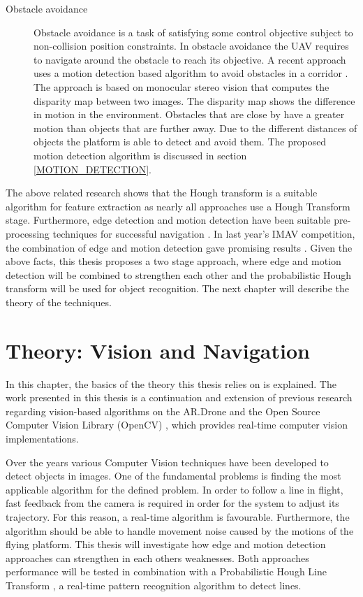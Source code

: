 \documentclass[a4paper]{article}
\begin{document}
\begin{description}
\item[Obstacle avoidance] Obstacle avoidance is a task of satisfying some control objective subject to non-collision position constraints. In obstacle avoidance the UAV requires to navigate around the obstacle to reach its objective. A recent approach uses a motion detection based algorithm to avoid obstacles in a corridor \cite{Jurriaans2011}. The approach is based on monocular stereo vision that computes the disparity map between two images. The disparity map shows the difference in motion in the environment. Obstacles that are close by have a greater motion than objects that are further away. Due to the different distances of objects the platform is able to detect and avoid them. The proposed motion detection algorithm is discussed in section \ref{MOTION_DETECTION}.
\end{description}

The above related research shows that the Hough transform is a suitable algorithm for feature extraction as nearly all approaches use a Hough Transform stage. Furthermore, edge detection and motion detection have been suitable pre-processing techniques for successful navigation \cite{Bills2011, Jurriaans2011}. In last year's IMAV competition, the combination of edge and motion detection gave promising results \cite{Gerke2011}. Given the above facts, this thesis proposes a two stage approach, where edge and motion detection will be combined to strengthen each other and the probabilistic Hough transform will be used for object recognition. The next chapter will describe the theory of the techniques.

\newpage
\section{Theory: Vision and Navigation}
\label{THEORY}
In this chapter, the basics of the theory this thesis relies on is explained. The work presented in this thesis is a continuation and extension of previous research regarding vision-based algorithms on the AR.Drone \cite{Jurriaans2011} and the Open Source Computer Vision Library (OpenCV) \cite{Bradski2008}, which provides real-time computer vision implementations.

Over the years various Computer Vision techniques have been developed to detect objects in images. One of the fundamental problems is finding the most applicable algorithm for the defined problem. In order to follow a line in flight, fast feedback from the camera is required in order for the system to adjust its trajectory. For this reason, a real-time algorithm is favourable. Furthermore, the algorithm should be able to handle movement noise caused by the motions of the flying platform. This thesis will investigate how edge and motion detection approaches can strengthen in each others weaknesses. Both approaches performance will be tested in combination with a Probabilistic Hough Line Transform \cite{Kiryati1991}, a real-time pattern recognition algorithm to detect lines.
\end{document}
